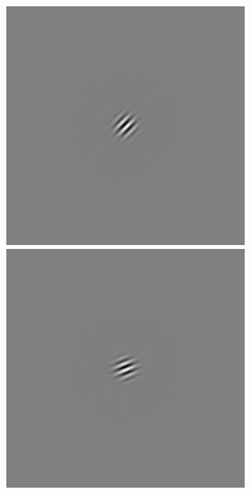 \begin{figure}[ht]
\begin{center}
 \includegraphics[width=\columnwidth/9]{ch4/figures/iGabor1_2.jpg}
 \includegraphics[width=\columnwidth/9]{ch4/figures/iGabor1_3.jpg}

\end{center}
\end{figure}
